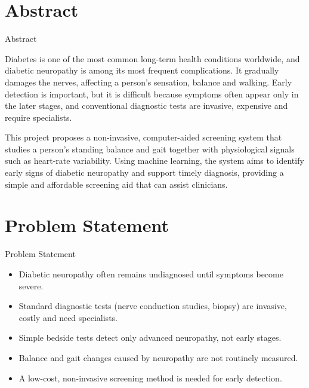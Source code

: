 \documentclass[10pt,aspectratio=1610]{beamer}
\begin{document}
\section{Abstract}

\begin{frame}{Abstract}

\small

Diabetes is one of the most common long-term health conditions worldwide, and diabetic neuropathy is among its most frequent complications. It gradually damages the nerves, affecting a person's sensation, balance and walking. Early detection is important, but it is difficult because symptoms often appear only in the later stages, and conventional diagnostic tests are invasive, expensive and require specialists.

This project proposes a non-invasive, computer-aided screening system that studies a person's standing balance and gait together with physiological signals such as heart-rate variability. Using machine learning, the system aims to identify early signs of diabetic neuropathy and support timely diagnosis, providing a simple and affordable screening aid that can assist clinicians.

\end{frame}


\section{Problem Statement}

\begin{frame}{Problem Statement}

\begin{itemize}

\item Diabetic neuropathy often remains undiagnosed until symptoms become severe.

\item Standard diagnostic tests (nerve conduction studies, biopsy) are invasive, costly and need specialists.

\item Simple bedside tests detect only advanced neuropathy, not early stages.

\item Balance and gait changes caused by neuropathy are not routinely measured.

\item A low-cost, non-invasive screening method is needed for early detection.

\end{itemize}

\end{frame}
\end{document}
